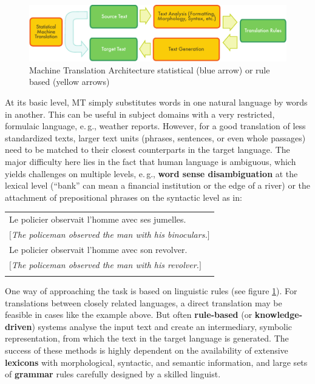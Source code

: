 \begin{multicols}{2}
\begin{figure}
\begin{center}
 \includegraphics[width=\textwidth]{../_media/english/machine_translation}
\caption{Machine Translation Architecture statistical (blue arrow) or rule based (yellow arrows)}
\label{fig:mtarchiEng}
\end{center}
\end{figure}

At its basic level, MT simply substitutes words in one natural
language by words in another. This can be useful in subject domains
with a very restricted, formulaic language, e.\,g., weather
reports. However, for a good translation of less standardized texts,
larger text units (phrases, sentences, or even whole passages) need to
be matched to their closest counterparts in the target language. The
major difficulty here lies in the fact that human language is
ambiguous, which yields challenges on multiple levels, e.\,g., {\bf word
sense disambiguation} at the lexical level (``bank'' can mean a financial institution or the edge of a river) or the attachment of prepositional phrases on the syntactic
level as in:
\begin{tabular}{l}
\\
Le policier observait l'homme avec ses jumelles.\\
$[${\em The policeman observed the man with his binoculars.}$]$\\
Le policier observait l'homme avec son revolver.\\
$[${\em The policeman observed the man with his revolver.}$]$\\
\\
\end{tabular}

One way of approaching the task is based on linguistic rules (see figure \ref{fig:mtarchiEng}). For
translations between closely related languages, a direct translation
may be feasible in cases like the example above. But often {\bf rule-based}
(or {\bf knowledge-driven}) systems analyse the input text and create an
intermediary, symbolic representation, from which the text in the
target language is generated. The success of these methods is highly
dependent on the availability of extensive {\bf lexicons} with
morphological, syntactic, and semantic information, and large sets of
{\bf grammar} rules carefully designed by a skilled linguist.


\end{multicols}
